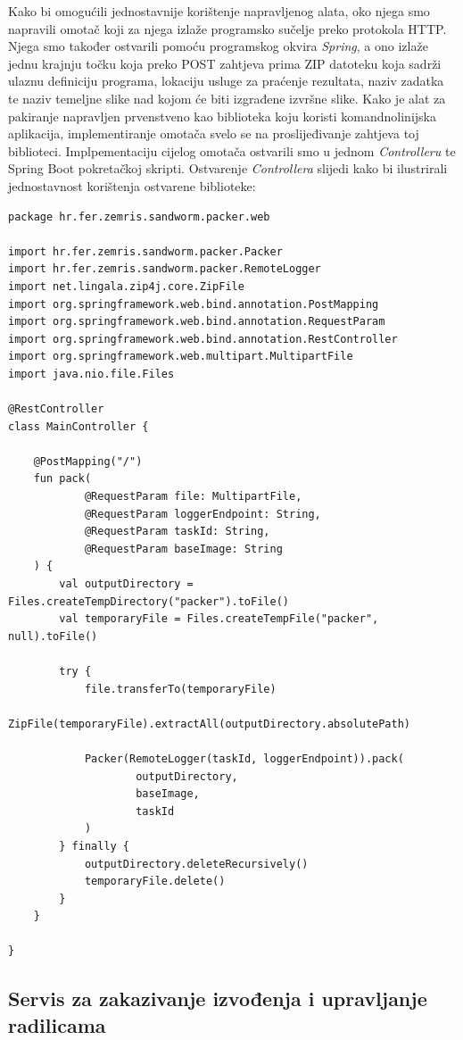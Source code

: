 \documentclass[times, utf8, zavrsni]{fer}
\begin{document}
{Kako bi omogućili jednostavnije korištenje napravljenog alata, oko njega smo napravili omotač koji za njega izlaže programsko sučelje preko protokola HTTP. Njega smo također ostvarili pomoću programskog okvira {\textit{Spring}}, a ono izlaže jednu krajnju točku koja preko POST zahtjeva prima ZIP datoteku koja sadrži ulaznu definiciju programa, lokaciju usluge za praćenje rezultata, naziv zadatka te naziv temeljne slike nad kojom će biti izgrađene izvršne slike. Kako je alat za pakiranje napravljen prvenstveno kao biblioteka koju koristi komandnolinijska aplikacija, implementiranje omotača svelo se na proslijeđivanje zahtjeva toj biblioteci. Implpementaciju cijelog omotača ostvarili smo u jednom {\textit{Controlleru}} te Spring Boot pokretačkoj skripti. Ostvarenje {\textit{Controllera}} slijedi kako bi ilustrirali jednostavnost korištenja ostvarene biblioteke:

\begin{lstlisting}
package hr.fer.zemris.sandworm.packer.web

import hr.fer.zemris.sandworm.packer.Packer
import hr.fer.zemris.sandworm.packer.RemoteLogger
import net.lingala.zip4j.core.ZipFile
import org.springframework.web.bind.annotation.PostMapping
import org.springframework.web.bind.annotation.RequestParam
import org.springframework.web.bind.annotation.RestController
import org.springframework.web.multipart.MultipartFile
import java.nio.file.Files

@RestController
class MainController {

    @PostMapping("/")
    fun pack(
            @RequestParam file: MultipartFile,
            @RequestParam loggerEndpoint: String,
            @RequestParam taskId: String,
            @RequestParam baseImage: String
    ) {
        val outputDirectory = Files.createTempDirectory("packer").toFile()
        val temporaryFile = Files.createTempFile("packer", null).toFile()

        try {
            file.transferTo(temporaryFile)
            ZipFile(temporaryFile).extractAll(outputDirectory.absolutePath)

            Packer(RemoteLogger(taskId, loggerEndpoint)).pack(
                    outputDirectory,
                    baseImage,
                    taskId
            )
        } finally {
            outputDirectory.deleteRecursively()
            temporaryFile.delete()
        }
    }

}
\end{lstlisting}

\subsection{Servis za zakazivanje izvođenja i upravljanje radilicama}

}
\end{document}

